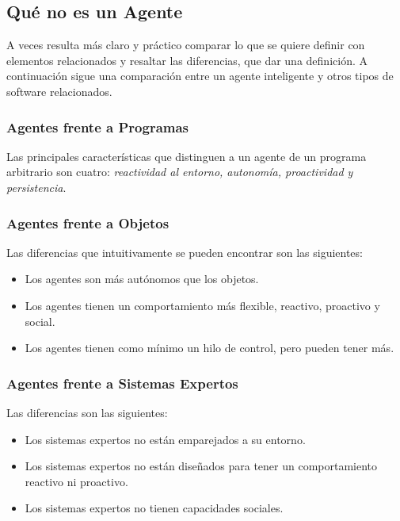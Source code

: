 \subsection{Qué no es un Agente}


A veces resulta más claro y práctico comparar lo que se quiere definir con
elementos relacionados y resaltar las diferencias, que dar una definición. A
continuación sigue una comparación entre un agente inteligente y otros tipos de
software relacionados.

\subsubsection{Agentes frente a Programas}

Las principales características que distinguen a un agente de un programa
arbitrario son cuatro: {\em reactividad al entorno, autonomía, proactividad y
persistencia}\cite{Franklin96}.

\subsubsection{Agentes frente a Objetos}

Las diferencias que intuitivamente se pueden encontrar son las
siguientes\cite{Wooldridge95}:

\begin{itemize}
 \item Los agentes son más autónomos que los objetos.
 \item Los agentes tienen un comportamiento más flexible, reactivo, proactivo
 y social.
 \item Los agentes tienen como mínimo un hilo de control, pero pueden tener más.
\end{itemize}

\subsubsection{Agentes frente a Sistemas Expertos}

Las diferencias son las siguientes\cite{Wooldridge95}:

\begin{itemize}
 \item Los sistemas expertos no están emparejados a su entorno.
 \item Los sistemas expertos no están diseñados para tener un comportamiento
 reactivo ni proactivo.
 \item Los sistemas expertos no tienen capacidades sociales.
\end{itemize}

